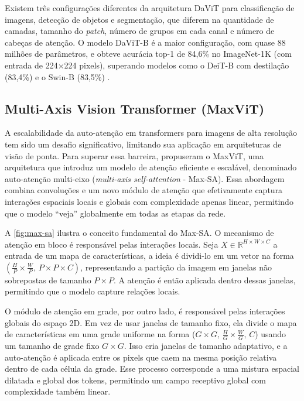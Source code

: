 Existem três configurações diferentes da arquitetura DaViT para classificação de imagens, detecção de objetos e segmentação, que diferem na quantidade de camadas, tamanho do \textit{patch}, número de grupos em cada canal e número de cabeças de atenção. O modelo DaViT-B é a maior configuração, com quase 88 milhões de parâmetros, e obteve acurácia top-1 de 84,6\% no ImageNet-1K (com entrada de 224×224 pixels), superando modelos como o DeiT-B com destilação (83,4\%) e o Swin-B (83,5\%) \cite{Touvron2021, Liu2021}.

\subsection{Multi-Axis Vision Transformer (MaxViT)}

A escalabilidade da auto-atenção em transformers para imagens de alta resolução tem sido um desafio significativo, limitando sua aplicação em arquiteturas de visão de ponta. Para superar essa barreira,  propuseram o MaxViT, uma arquitetura que introduz um modelo de atenção eficiente e escalável, denominado auto-atenção multi-eixo (\textit{multi-axis self-attention} - Max-SA). Essa abordagem combina convoluções e um novo módulo de atenção que efetivamente captura interações espaciais locais e globais com complexidade apenas linear, permitindo que o modelo ``veja'' globalmente em todas as etapas da rede.

A \autoref{fig:max-sa} ilustra o conceito fundamental do Max-SA. O mecanismo de atenção em bloco é responsável pelas interações locais. Seja $X \in \mathbb{R}^{H \times W \times C}$ a entrada de um mapa de características, a ideia é dividi-lo em um vetor na forma $(\frac{H}{P} \times \frac{W}{P} \text{, } P \times P \times C)$, representando a partição da imagem em janelas não sobrepostas de tamanho $P \times P$. A atenção é então aplicada dentro dessas janelas, permitindo que o modelo capture relações locais.

O módulo de atenção em grade, por outro lado, é responsável pelas interações globais do espaço 2D. Em vez de usar janelas de tamanho fixo, ela divide o mapa de características em uma grade uniforme na forma ($G \times G \text{, } \frac{H}{G} \times \frac{W}{G} \text{, } C$) usando um tamanho de grade fixo $G \times G$. Isso cria janelas de tamanho adaptativo, e a auto-atenção é aplicada entre os pixels que caem na mesma posição relativa dentro de cada célula da grade. Esse processo corresponde a uma mistura espacial dilatada e global dos tokens, permitindo um campo receptivo global com complexidade também linear.

